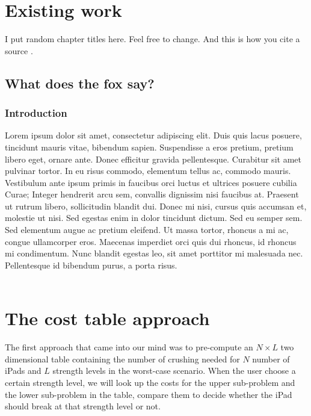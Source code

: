 \documentclass[12pt,a4paper,oneside]{report}
\begin{document}

\chapter{Existing work}
I put random chapter titles here. Feel free to change. And this is how you cite a source \cite{randomblogpost}.

\section{What does the fox say?}
\subsection{Introduction}
Lorem ipsum dolor sit amet, consectetur adipiscing elit. Duis quis lacus posuere, tincidunt mauris vitae, bibendum sapien. Suspendisse a eros pretium, pretium libero eget, ornare ante. Donec efficitur gravida pellentesque. Curabitur sit amet pulvinar tortor. In eu risus commodo, elementum tellus ac, commodo mauris. Vestibulum ante ipsum primis in faucibus orci luctus et ultrices posuere cubilia Curae; Integer hendrerit arcu sem, convallis dignissim nisi faucibus at. Praesent ut rutrum libero, sollicitudin blandit dui. Donec mi nisi, cursus quis accumsan et, molestie ut nisi. Sed egestas enim in dolor tincidunt dictum. Sed eu semper sem. Sed elementum augue ac pretium eleifend. Ut massa tortor, rhoncus a mi ac, congue ullamcorper eros. Maecenas imperdiet orci quis dui rhoncus, id rhoncus mi condimentum. Nunc blandit egestas leo, sit amet porttitor mi malesuada nec. Pellentesque id bibendum purus, a porta risus. \\\\


\chapter{The cost table approach}
The first approach that came into our mind was to pre-compute an $N \times L$ two dimensional table containing the number of crushing needed for $N$ number of iPads and $L$ strength levels in the worst-case scenario. When the user choose a certain strength level, we will look up the costs for the upper sub-problem and the lower sub-problem in the table, compare them to decide whether the iPad should break at that strength level or not.
\end{document}
